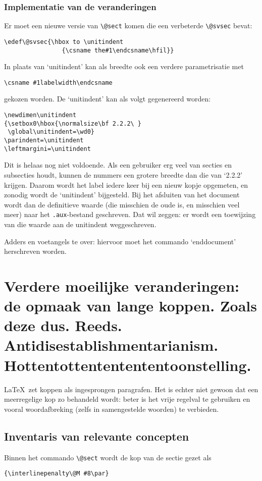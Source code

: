 \documentclass[a4paper]{artikel1} %
\begin{document}
\subsubsection{Implementatie van de veranderingen}
Er moet een nieuwe versie van \verb.\@sect. komen die een verbeterde
\verb.\@svsec. bevat:
\begin{verbatim}
\edef\@svsec{\hbox to \unitindent
                {\csname the#1\endcsname\hfil}}
\end{verbatim}
In plaats van `unitindent' kan als breedte ook een verdere
parametrisatie met
\begin{verbatim}\csname #1labelwidth\endcsname
\end{verbatim}
gekozen worden.  De `unitindent' kan als volgt gegenereerd worden:
\begin{verbatim}
\newdimen\unitindent
{\setbox0\hbox{\normalsize\bf 2.2.2\ }
 \global\unitindent=\wd0}
\parindent=\unitindent
\leftmargini=\unitindent
\end{verbatim}
 
Dit is helaas nog niet voldoende.  Als een gebruiker erg veel van
secties en subsecties houdt, kunnen de nummers een grotere breedte dan
die van `2.2.2' krijgen.  Daarom wordt het label iedere keer bij een
nieuw kopje opgemeten, en zonodig wordt de `unitindent' bijgesteld.
Bij het afsluiten van het document wordt dan de definitieve waarde
(die misschien de oude is, en misschien veel meer) naar het
\texttt{.aux}-bestand geschreven.  Dat wil zeggen: er wordt een
toewijzing van die waarde aan de unitindent weggeschreven.
 
Adders en voetangels te over: hiervoor moet het commando `enddocument'
herschreven worden.
 
 
\section{Verdere moeilijke veranderingen: de opmaak van
  lange koppen. Zoals deze dus.  Reeds. Antidisestablishmentarianism.
  Hottentottententententoonstelling.}
 
\LaTeX\ zet koppen als ingesprongen paragrafen. Het is echter niet
gewoon dat een meerregelige kop zo behandeld wordt: beter is het vrije
regelval te gebruiken en vooral woordafbreking (zelfs in samengestelde
woorden) te verbieden.
 
\subsection{Inventaris van relevante concepten}
Binnen het commando \verb.\@sect. wordt de kop van de sectie gezet als
\begin{verbatim}
{\interlinepenalty\@M #8\par}
\end{verbatim}
 
\end{document}
